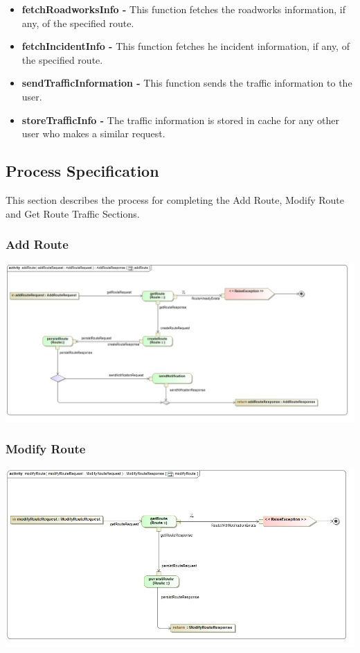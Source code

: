 \documentclass[a4paper,12pt]{article}
\begin{document}
\begin{itemize}
\item \textbf{fetchRoadworksInfo -} This function fetches the roadworks information, if any, of the specified route.
\item \textbf{fetchIncidentInfo -} This function fetches he incident information, if any, of the specified route.
\item \textbf{sendTrafficInformation -} This function sends the traffic information to the user.
\item \textbf{storeTrafficInfo -} The traffic information is stored in cache for any other user who makes a similar request.
\end{itemize}

\subsection{Process Specification}
This section describes the process for completing the Add Route, Modify Route and Get Route Traffic Sections.
\subsubsection{Add Route}
\includegraphics[width=\textwidth]{images/psAdd_Route.jpg}
\subsubsection{Modify Route}
\includegraphics[width=\textwidth]{images/psModify_Route.jpg} 
\end{document}
